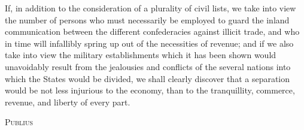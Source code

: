 If, in addition to the consideration of a plurality of civil lists, we take into view the number of persons who must necessarily be employed to guard the inland communication between the different confederacies against illicit trade, and who in time will infallibly spring up out of the necessities of revenue; and if we also take into view the military establishments which it has been shown would unavoidably result from the jealousies and conflicts of the several nations into which the States would be divided, we shall clearly discover that a separation would be not less injurious to the economy, than to the tranquillity, commerce, revenue, and liberty of every part.

\vspace{.5cm}
\textsc{Publius}
